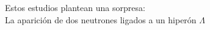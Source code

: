 \documentclass[preview]{standalone}
\begin{document}
\begin{center}
Estos estudios plantean una sorpresa:\\La aparición de dos neutrones ligados a un hiperón $\Lambda$
\end{center}
\end{document}
